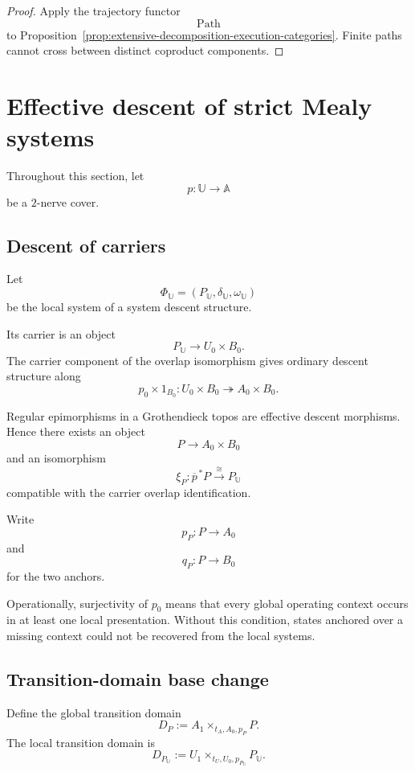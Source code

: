 \begin{proof}
Apply the trajectory functor
\[
    \operatorname{Path}
\]
to
Proposition~\ref{prop:extensive-decomposition-execution-categories}.
Finite paths cannot cross between distinct coproduct components.
\end{proof}

\section{Effective descent of strict Mealy systems}
\label{sec:effective-descent-strict-mealy-systems}

Throughout this section, let
\[
    p:\mathbb U\to\mathbb A
\]
be a \(2\)-nerve cover.

\subsection{Descent of carriers}
\label{subsec:descent-of-carriers}

Let
\[
    \Phi_{\mathbb U}
    =
    (P_{\mathbb U},
    \delta_{\mathbb U},
    \omega_{\mathbb U})
\]
be the local system of a system descent structure.

Its carrier is an object
\[
    P_{\mathbb U}
    \to
    U_0\times B_0.
\]
The carrier component of the overlap isomorphism gives ordinary descent
structure along
\[
    p_0\times1_{B_0}:
    U_0\times B_0
    \twoheadrightarrow
    A_0\times B_0.
\]

Regular epimorphisms in a Grothendieck topos are effective descent morphisms.
Hence there exists an object
\[
    P\to A_0\times B_0
\]
and an isomorphism
\[
    \xi_P:
    \overline p^{\,\ast}P
    \xrightarrow{\cong}
    P_{\mathbb U}
\]
compatible with the carrier overlap identification.

Write
\[
    p_P:P\to A_0
\]
and
\[
    q_P:P\to B_0
\]
for the two anchors.

Operationally, surjectivity of \(p_0\) means that every global operating
context occurs in at least one local presentation. Without this condition,
states anchored over a missing context could not be recovered from the local
systems.

\subsection{Transition-domain base change}
\label{subsec:derivative-domain-base-change}

Define the global transition domain
\[
    D_P
    :=
    A_1\times_{t_A,A_0,p_P}P.
\]
The local transition domain is
\[
    D_{P_{\mathbb U}}
    :=
    U_1
    \times_{t_U,U_0,p_{P_{\mathbb U}}}
    P_{\mathbb U}.
\]

